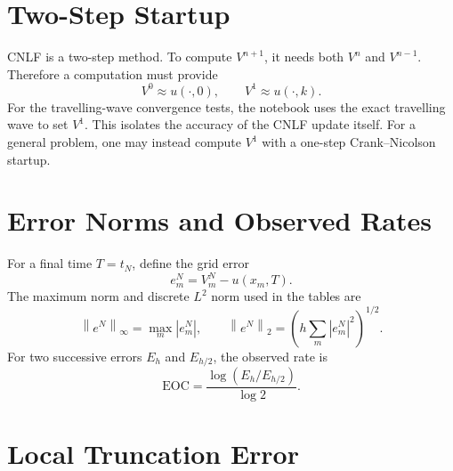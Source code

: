 \documentclass[11pt]{article}
\newcommand{\eoc}{\mathrm{EOC}}
\newcommand{\norm}[1]{\left\lVert #1\right\rVert}
\begin{document}
\section{Two-Step Startup}

CNLF is a two-step method.  To compute $V^{n+1}$, it needs both $V^n$ and $V^{n-1}$.
Therefore a computation must provide
\begin{equation}
    V^0\approx u(\cdot,0),
    \qquad
    V^1\approx u(\cdot,k).
\end{equation}
For the travelling-wave convergence tests, the notebook uses the exact travelling wave
to set $V^1$.  This isolates the accuracy of the CNLF update itself.  For a general
problem, one may instead compute $V^1$ with a one-step Crank--Nicolson startup.

\section{Error Norms and Observed Rates}

For a final time $T=t_N$, define the grid error
\begin{equation}
    e_m^N=V_m^N-u(x_m,T).
\end{equation}
The maximum norm and discrete $L^2$ norm used in the tables are
\begin{equation}
    \norm{e^N}_\infty=\max_m |e_m^N|,
    \qquad
    \norm{e^N}_2=
    \left(h\sum_m |e_m^N|^2\right)^{1/2}.
\end{equation}
For two successive errors $E_h$ and $E_{h/2}$, the observed rate is
\begin{equation}
    \eoc=
    \frac{\log(E_h/E_{h/2})}{\log 2}.
\end{equation}

\section{Local Truncation Error}
\end{document}
